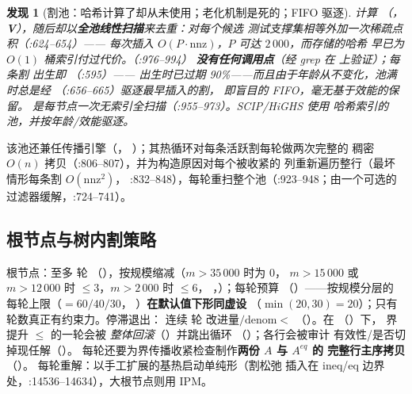 \documentclass[11pt]{ctexart}
\newtheorem{finding}{发现}
\newcommand{\nnz}{\mathrm{nnz}}
\begin{document}
\begin{finding}[割池：哈希计算了却从未使用；老化机制是死的；FIFO 驱逐]
\label{find:cut-pool}
 计算 （，
\textbf{V}），随后却以\textbf{全池线性扫描}来去重：对每个候选
测试支撑集相等外加一次稀疏点积（:624--654）——
每次插入 $O(P \cdot \nnz)$，$P$ 可达 $2\,000$，而存储的哈希
早已为 $O(1)$ 桶索引付过代价。（:976--994）
\textbf{没有任何调用点}（经 grep 在  上验证）；每条割
出生即 （:595）——
出生时已过期 90\%——而且由于年龄从不变化，池满时总是经
（:656--665）驱逐最早\emph{插入}的割，
即盲目的 FIFO，毫无基于效能的保留。
是每节点一次无索引全扫描（:955--973）。SCIP/HiGHS 使用
哈希索引的池，并按年龄/效能驱逐。
\end{finding}

该池还兼任传播引擎（，
）；其热循环对每条活跃割每轮做两次完整的
稠密 $O(n)$ 拷贝（:806--807），并为构造原因对每个被收紧的
列重新遍历整行（最坏情形每条割 $O(\nnz^2)$，
:832--848），每轮重扫整个池（:923--948；由一个可选的
 过滤器缓解，:724--741）。

\subsection{根节点与树内割策略}
\label{sec:root-tree-cuts}
根节点：至多  轮
（），按规模缩减（$m>35\,000$ 时为 0，
$m>15\,000$ 或 $m>12\,000$ 时 $\le 3$，$m>2\,000$ 时 $\le 6$，
，）；每轮预算
（）——按规模分层的
每轮上限（$=60/40/30$，
）\textbf{在默认值下形同虚设}
（$\min(20,30)=20$）；只有轮数真正有约束力。停滞退出：
连续  轮
改进量$/\mathrm{denom} < $ 
（）。在
（）下，
界提升 $\le$  的一轮会被
\emph{整体回滚}（）并跳出循环
（）；各行会被审计
有效性/是否切掉现任解（）。
每轮还要为界传播收紧检查制作\textbf{两份 $A$ 与 $A^{eq}$ 的
完整行主序拷贝}（）。
每轮重解：以手工扩展的基热启动单纯形（割松弛
插入在 ineq/eq 边界处，:14536--14634），大根节点则用 IPM。
\end{document}
